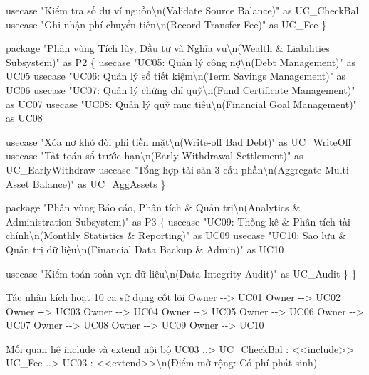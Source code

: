 \documentclass[11pt,a4paper]{article}
\newenvironment{Shaded}{}{}
\newcommand{\NormalTok}[1]{#1}
\begin{document}
\begin{Shaded}
\begin{Highlighting}[]
\NormalTok{        usecase "Kiểm tra số dư ví nguồn\textbackslash{}n(Validate Source Balance)" as UC\_CheckBal}
\NormalTok{        usecase "Ghi nhận phí chuyển tiền\textbackslash{}n(Record Transfer Fee)" as UC\_Fee}
\NormalTok{    \}}

\NormalTok{    package "Phân vùng Tích lũy, Đầu tư và Nghĩa vụ\textbackslash{}n(Wealth \& Liabilities Subsystem)" as P2 \{}
\NormalTok{        usecase "UC05: Quản lý công nợ\textbackslash{}n(Debt Management)" as UC05}
\NormalTok{        usecase "UC06: Quản lý sổ tiết kiệm\textbackslash{}n(Term Savings Management)" as UC06}
\NormalTok{        usecase "UC07: Quản lý chứng chỉ quỹ\textbackslash{}n(Fund Certificate Management)" as UC07}
\NormalTok{        usecase "UC08: Quản lý quỹ mục tiêu\textbackslash{}n(Financial Goal Management)" as UC08}
        
\NormalTok{        usecase "Xóa nợ khó đòi phi tiền mặt\textbackslash{}n(Write{-}off Bad Debt)" as UC\_WriteOff}
\NormalTok{        usecase "Tất toán sổ trước hạn\textbackslash{}n(Early Withdrawal Settlement)" as UC\_EarlyWithdraw}
\NormalTok{        usecase "Tổng hợp tài sản 3 cấu phần\textbackslash{}n(Aggregate Multi{-}Asset Balance)" as UC\_AggAssets}
\NormalTok{    \}}

\NormalTok{    package "Phân vùng Báo cáo, Phân tích \& Quản trị\textbackslash{}n(Analytics \& Administration Subsystem)" as P3 \{}
\NormalTok{        usecase "UC09: Thống kê \& Phân tích tài chính\textbackslash{}n(Monthly Statistics \& Reporting)" as UC09}
\NormalTok{        usecase "UC10: Sao lưu \& Quản trị dữ liệu\textbackslash{}n(Financial Data Backup \& Admin)" as UC10}
        
\NormalTok{        usecase "Kiểm toán toàn vẹn dữ liệu\textbackslash{}n(Data Integrity Audit)" as UC\_Audit}
\NormalTok{    \}}
\NormalTok{\}}

\NormalTok{\textquotesingle{} Tác nhân kích hoạt 10 ca sử dụng cốt lõi}
\NormalTok{Owner {-}{-}\textgreater{} UC01}
\NormalTok{Owner {-}{-}\textgreater{} UC02}
\NormalTok{Owner {-}{-}\textgreater{} UC03}
\NormalTok{Owner {-}{-}\textgreater{} UC04}
\NormalTok{Owner {-}{-}\textgreater{} UC05}
\NormalTok{Owner {-}{-}\textgreater{} UC06}
\NormalTok{Owner {-}{-}\textgreater{} UC07}
\NormalTok{Owner {-}{-}\textgreater{} UC08}
\NormalTok{Owner {-}{-}\textgreater{} UC09}
\NormalTok{Owner {-}{-}\textgreater{} UC10}

\NormalTok{\textquotesingle{} Mối quan hệ include và extend nội bộ}
\NormalTok{UC03 ..\textgreater{} UC\_CheckBal : \textless{}\textless{}include\textgreater{}\textgreater{}}
\NormalTok{UC\_Fee ..\textgreater{} UC03 : \textless{}\textless{}extend\textgreater{}\textgreater{}\textbackslash{}n(Điểm mở rộng: Có phí phát sinh)}


\end{Highlighting}
\end{Shaded}
\end{document}

